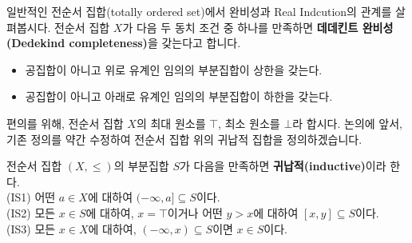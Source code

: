 \documentclass[serif]{beamer}
\begin{document}
\begin{frame}{}
    일반적인 전순서 집합(totally ordered set)에서 완비성과 Real Indcution의 관계를 살펴봅시다.
    전순서 집합 $X$가 다음 두 동치 조건 중 하나를 만족하면 \textbf{데데킨트 완비성(Dedekind completeness)}을 갖는다고 합니다.
    \begin{itemize}
        \item[-] 공집합이 아니고 위로 유계인 임의의 부분집합이 상한을 갖는다.
        \item[-] 공집합이 아니고 아래로 유계인 임의의 부분집합이 하한을 갖는다.
    \end{itemize}
    편의를 위해, 전순서 집합 $X$의 최대 원소를 $\top$, 최소 원소를 $\bot$라 합시다.
    논의에 앞서, 기존 정의를 약간 수정하여 전순서 집합 위의 귀납적 집합을 정의하겠습니다.
    \begin{dfn*}{}
        전순서 집합 $(X,\leq)$의 부분집합 $S$가 다음을 만족하면 \textbf{귀납적(inductive)}이라 한다. \\[3pt]
        (IS1) 어떤 $a\in X$에 대하여 $(-\infty,a]\subseteq S$이다. \\
        (IS2) 모든 $x\in S$에 대하여, $x=\top$이거나 어떤 $y>x$에 대하여 $[x,y]\subseteq S$이다. \\
        (IS3) 모든 $x\in X$에 대하여, $(-\infty, x)\subseteq S$이면 $x\in S$이다.
    \end{dfn*}
\end{frame}
\end{document}
